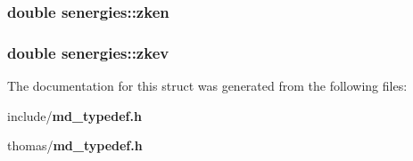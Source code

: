 \subsubsection{\setlength{\rightskip}{0pt plus 5cm}double {\bf senergies::zken}}\label{structsenergies_db92e4d4d28d1594a09878012363b431}


\subsubsection{\setlength{\rightskip}{0pt plus 5cm}double {\bf senergies::zkev}}\label{structsenergies_a379d4c833ae7d6de830571567659736}




The documentation for this struct was generated from the following files:\begin{CompactItemize}
\item 
include/{\bf md\_\-typedef.h}\item 
thomas/{\bf md\_\-typedef.h}\end{CompactItemize}
